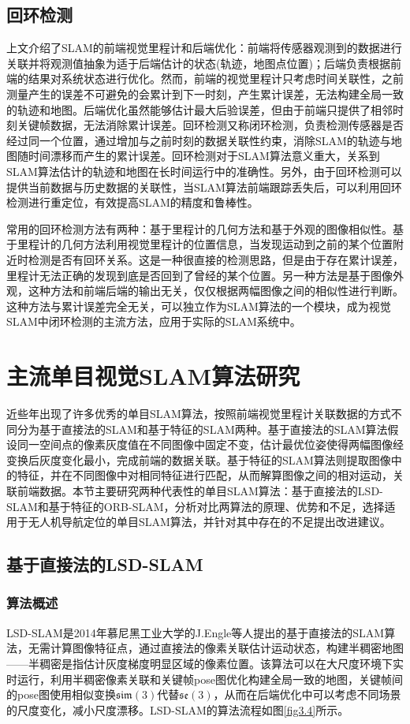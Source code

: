 \subsection{回环检测}
上文介绍了SLAM的前端视觉里程计和后端优化：前端将传感器观测到的数据进行关联并将观测值抽象为适于后端估计的状态(轨迹，地图点位置)；后端负责根据前端的结果对系统状态进行优化。然而，前端的视觉里程计只考虑时间关联性，之前测量产生的误差不可避免的会累计到下一时刻，产生累计误差，无法构建全局一致的轨迹和地图。后端优化虽然能够估计最大后验误差，但由于前端只提供了相邻时刻关键帧数据，无法消除累计误差。回环检测又称闭环检测，负责检测传感器是否经过同一个位置，通过增加与之前时刻的数据关联性约束，消除SLAM的轨迹与地图随时间漂移而产生的累计误差。回环检测对于SLAM算法意义重大，关系到SLAM算法估计的轨迹和地图在长时间运行中的准确性。另外，由于回环检测可以提供当前数据与历史数据的关联性，当SLAM算法前端跟踪丢失后，可以利用回环检测进行重定位，有效提高SLAM的精度和鲁棒性。

常用的回环检测方法有两种\upcite{[3.7]}：基于里程计的几何方法和基于外观的图像相似性。基于里程计的几何方法利用视觉里程计的位置信息，当发现运动到之前的某个位置附近时检测是否有回环关系。这是一种很直接的检测思路，但是由于存在累计误差，里程计无法正确的发现到底是否回到了曾经的某个位置。另一种方法是基于图像外观，这种方法和前端后端的输出无关，仅仅根据两幅图像之间的相似性进行判断。这种方法与累计误差完全无关，可以独立作为SLAM算法的一个模块，成为视觉SLAM中闭环检测的主流方法，应用于实际的SLAM系统中。


\section{主流单目视觉SLAM算法研究}
近些年出现了许多优秀的单目SLAM算法，按照前端视觉里程计关联数据的方式不同分为基于直接法的SLAM和基于特征的SLAM两种。基于直接法的SLAM算法假设同一空间点的像素灰度值在不同图像中固定不变，估计最优位姿使得两幅图像经变换后灰度变化最小，完成前端的数据关联。基于特征的SLAM算法则提取图像中的特征，并在不同图像中对相同特征进行匹配，从而解算图像之间的相对运动，关联前端数据。本节主要研究两种代表性的单目SLAM算法：基于直接法的LSD-SLAM和基于特征的ORB-SLAM，分析对比两算法的原理、优势和不足，选择适用于无人机导航定位的单目SLAM算法，并针对其中存在的不足提出改进建议。

\subsection{基于直接法的LSD-SLAM}

\subsubsection{算法概述}
LSD-SLAM是2014年慕尼黑工业大学的J.Engle等人提出的基于直接法的SLAM算法，无需计算图像特征点，通过直接法的像素关联估计运动状态，构建半稠密地图——半稠密是指估计灰度梯度明显区域的像素位置。该算法可以在大尺度环境下实时运行，利用半稠密像素关联和关键帧pose图优化构建全局一致的地图，关键帧间的pose图使用相似变换$\mathfrak{sim}(3)$代替$\mathfrak{se}(3)$，从而在后端优化中可以考虑不同场景的尺度变化，减小尺度漂移。LSD-SLAM的算法流程\upcite{[1.21]}如图\ref{fig3.4}所示。

